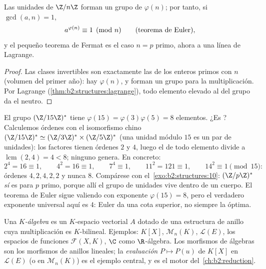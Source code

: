 \begin{theorem}\label{thm:b2:structures:euler}
Las unidades de $\Z/n\Z$ forman un grupo de  $\varphi(n)$; por
tanto, si $\gcd(a, n) = 1$,
\[
a^{\varphi(n)} \equiv 1 \pmod n
\qquad (\text{teorema de Euler\index{teorema de Euler}}),
\]
y el pequeño teorema de Fermat es el caso $n = p$ primo, ahora a una
línea de Lagrange.
\end{theorem}

\begin{proof}
Las clases invertibles son exactamente las de los enteros primos con
$n$ (volumen del primer año): hay $\varphi(n)$, y forman un grupo
para la multiplicación. Por Lagrange
(\cref{thm:b2:structures:lagrange}), todo elemento elevado al 
del grupo da el neutro.
\end{proof}

\begin{example}\label{ex:b2:structures:units15}
El grupo $(\Z/15\Z)^*$ tiene $\varphi(15) = \varphi(3)\varphi(5)
= 8$ elementos. ¿Es ? Calculemos órdenes con el
isomorfismo chino $(\Z/15\Z)^* \simeq (\Z/3\Z)^* \times
(\Z/5\Z)^*$ (una unidad módulo $15$ es un par de unidades): los
factores tienen órdenes $2$ y $4$, luego el  de todo elemento
divide a $\operatorname{lcm}(2, 4) = 4 < 8$; ninguno genera. En
concreto:
\[
2^4 = 16 \equiv 1, \qquad
4^2 = 16 \equiv 1, \qquad
7^4 \equiv 1, \qquad
11^2 = 121 \equiv 1, \qquad
14^2 \equiv 1 \pmod{15} :
\]
órdenes $4, 2, 4, 2, 2$ y nunca $8$. Compárese con el~\cref{exo:b2:structures:10}: $(\Z/p\Z)^*$ \emph{sí} es  para
$p$ primo, porque allí el grupo de unidades vive dentro de un
cuerpo. El teorema de Euler sigue valiendo con exponente
$\varphi(15) = 8$, pero el verdadero exponente universal aquí es
$4$: Euler da una cota superior, no siempre la óptima.
\end{example}

\begin{definition}[Álgebra]\label{def:b2:structures:algebra}
Una \emph{$K$-álgebra} es un $K$-espacio vectorial $A$
dotado de una estructura de anillo cuya multiplicación es
$K$-bilineal. Ejemplos: $K[X]$, $\mathcal{M}_n(K)$, $\mathcal{L}(E)$,
los espacios de funciones $\mathcal{F}(X, K)$, $\C$ como
$\R$-álgebra. Los morfismos de álgebras son los morfismos de anillos
lineales; la \emph{evaluación} $P \mapsto P(u)$ de $K[X]$ en
$\mathcal{L}(E)$ (o en $\mathcal{M}_n(K)$) es el ejemplo central, y
es el motor del~\cref{ch:b2:reduction}.
\end{definition}


